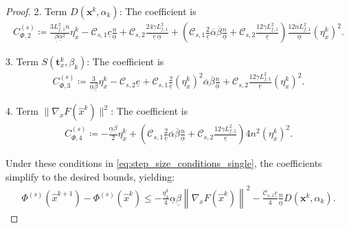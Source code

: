 \documentclass{article}
\theoremstyle{plain}
\theoremstyle{definition}
\theoremstyle{remark}
\begin{document}
\begin{proof}
    2. Term $D(\mathbf{x}^{k}, \alpha_{k})$: The coefficient is
    \begin{align*}
          C_{\Phi,2}^{(s)} \coloneqq \frac{3 L_{f,1}^{2} n}{\underline{\beta} \underline{\alpha}^{2}} \eta_x^{k} - \mathcal{C}_{s,1} \underline{c}\frac{n}{\underline{\alpha}} + \mathcal{C}_{s,2} \frac{24\gamma L_{f,1}^{2}}{\underline{e}\, \underline{\alpha}} + \left( \mathcal{C}_{s,1} \frac{2}{\underline{c}} \overline{\alpha}\overline{\beta}\frac{n}{\underline{\alpha}} + \mathcal{C}_{s,2} \frac{12\gamma L_{f,1}^{2}}{\underline{e}} \right) \frac{12 n L_{f,1}^{2}}{\underline{\alpha}} (\eta_{x}^{k})^{2}.
    \end{align*}
    
    3. Term $S(\mathbf{t}_{x}^{k},\beta_{k})$: The coefficient is
    \begin{align*}
          C_{\Phi,3}^{(s)} \coloneqq \frac{3}{\underline{\alpha}\underline{\beta}} \eta_x^{k} - \mathcal{C}_{s,2} \underline{e} + \mathcal{C}_{s,1} \frac{2}{\underline{c}}(\eta_{x}^{k})^{2} \overline{\alpha}\overline{\beta} \frac{n}{\underline{\alpha}} + \mathcal{C}_{s,2} \frac{12\gamma L_{f,1}^{2}}{\underline{e}} (\eta_{x}^{k})^{2}.
    \end{align*}

    
    4. Term $\|\nabla_{x} F({\hat{x}}^k)\|^{2}$: The coefficient is
    \begin{align*}
       C_{\Phi,4}^{(s)} \coloneqq - \frac{\underline{\alpha}\underline{\beta}}{2} \eta_x^{k} + \left( \mathcal{C}_{s,1} \frac{2}{\underline{c}} \overline{\alpha}\overline{\beta} \frac{n}{\underline{\alpha}}+ \mathcal{C}_{s,2} \frac{12\gamma L_{f,1}^{2}}{\underline{e}} \right) 4n^{2} (\eta_{x}^{k})^{2}.
    \end{align*}
   
    Under these conditions in \eqref{eq:step_size_conditions_single}, the coefficients simplify to the desired bounds, yielding:
    \begin{align}\label{eq:lyapunov_descent_single}
        \Phi^{(s)}({\hat{x}}^{k+1}) - \Phi^{(s)}({\hat{x}}^{k}) \leq - \frac{\eta_x^{k}}{4}\underline{\alpha}\underline{\beta} \left\| \nabla_{x}F(\hat{x}^{k}) \right\|^{2} - \frac{\mathcal{C}_{s,1} \underline{c}}{4} \frac{n}{\underline{\alpha}} D(\mathbf{x}^{k}, \alpha_{k}).
    \end{align}
\end{proof}
\end{document}
